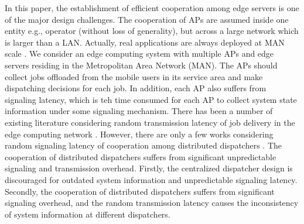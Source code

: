 In this paper, 
the establishment of efficient cooperation among edge servers is one of the major design challenges.
The cooperation of APs are assumed inside one entity e.g., operator (without loss of generality), but across a large network which is larger than a LAN.
Actually, real applications are always deployed at MAN scale .
We consider an edge computing system with multiple APs and edge servers residing in the Metropolitan Area Network (MAN).
The APs should collect jobs offloaded from the mobile users in its service area and make dispatching decisions for each job.
In addition, each AP also suffers from signaling latency, which is teh time consumed for each AP to collect system state information under some signaling mechanism.
There has been a number of existing literature considering random transmission latency of job delivery in the edge computing network \cite{latency-EDGE19,MOBIHOC19-ZhouZ,IOTJ18-FanQ,TOC19-LiuC,JSAC19-AlameddineHA}.
However, there are only a few works considering random signaling latency of cooperation among distributed dispatchers \cite{tan-online,TWC18-LyuX}.
The cooperation of distributed dispatchers suffers from significant unpredictable signaling and transmission overhead.
Firstly, the centralized dispatcher design is discouraged for outdated system information and unpredictable signaling latency.
Secondly, the cooperation of distributed dispatchers suffers from significant signaling overhead, and the random transmission latency causes the inconsistency of system information at different dispatchers.

